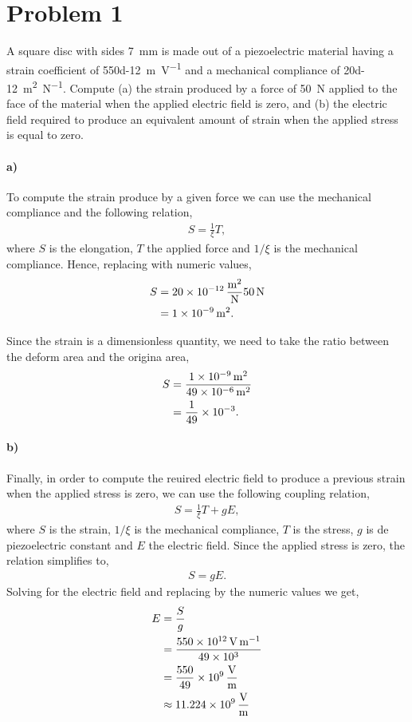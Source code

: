 \documentclass[../main.tex]{subfiles}
\begin{document}
\section{Problem 1}

A square disc with sides \SI{7}{\milli\meter} is made out of a piezoelectric material having a strain coefficient of \SI{550d-12}{\meter\per\volt} and a mechanical compliance of \SI{20d-12}{\meter\squared\per\newton}. 
Compute (a) the strain produced by a force of \SI{50}{\newton} applied to the face of the material when the applied electric field is zero, and (b) the electric field required to produce an equivalent amount of strain when the applied stress is equal to zero.


\paragraph{a)} To compute the strain produce by a given force we can use the mechanical compliance and the following relation,
\begin{gather*}
    S = \frac{1}{\xi}T,
\end{gather*}
where $S$ is the elongation, $T$ the applied force and $1/\xi$ is the mechanical compliance.
Hence, replacing with numeric values,
\begin{align*}
    S &= \SI[per-mode=fraction]{20d-12}{\meter\squared\per\newton}\SI{50}{\newton} \\
      &= \SI{1d-9}{\meter\squared}.
\end{align*}

Since the strain is a dimensionless quantity, we need to take the ratio between the deform area and the origina area,
\begin{align*}
    S &= \frac{\SI{1d-9}{\meter\squared}}{\SI{49d-6}{\meter\squared}} \\
      &= \frac{1}{49}\times\num{d-3}. 
\end{align*}

\paragraph{b)} Finally, in order to compute the reuired electric field to produce a previous strain when the applied stress is zero, we can use the following coupling relation,
\begin{align*}
    S = \frac{1}{\xi}T + g E,
\end{align*}
where $S$ is the strain, $1/\xi$ is the mechanical compliance, $T$ is the stress, $g$ is de piezoelectric constant and $E$ the electric field.
Since the applied stress is zero, the relation simplifies to,
\begin{align*}
    S = g E.
\end{align*}
Solving for the electric field and replacing by the numeric values we get,
\begin{align*}
    E &= \frac{S}{g} \\
      &= \frac{\SI{550d12}{\volt\per\meter}}{\num{49d3}} \\
      &= \frac{550}{49}\times\SI[per-mode=fraction]{d9}{\volt\per\meter} \\
      &\approx \SI[per-mode=fraction]{11.224d9}{\volt\per\meter} 
\end{align*}
\end{document}
